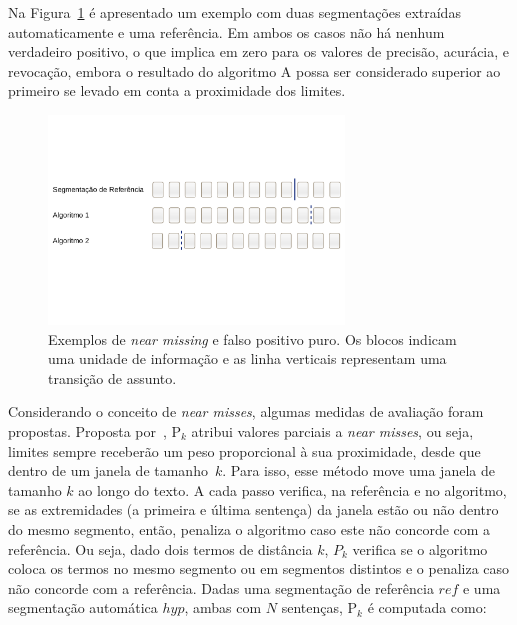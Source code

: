 Na Figura~\ref{fig:exemplosegmentacaozoom} é apresentado um exemplo com duas segmentações extraídas automaticamente e uma referência. Em ambos os casos não há nenhum verdadeiro positivo, o que implica em zero para os valores de precisão, acurácia, e revocação, embora o resultado do algoritmo A possa ser considerado superior ao primeiro se levado em conta a proximidade dos limites.

  \begin{figure}[!h]

	\centering
	\includegraphics[trim={ 0 180 0 180 },clip,page=1,width=0.7\textwidth]{conteudo/capitulos/figs/near-missing.pdf}
	\caption{Exemplos de \textit{near missing} e falso positivo puro. Os blocos indicam uma unidade de informação e as linha verticais representam uma transição de assunto. }
	\label{fig:exemplosegmentacaozoom}

  \end{figure}
  



Considerando o conceito de \textit{near misses}, algumas medidas de avaliação foram propostas. Proposta por~\cite{Beeferman1999}, P$_k$ atribui valores parciais a \textit{near misses}, ou seja, limites sempre receberão um peso proporcional à sua proximidade, desde que dentro de um janela de tamanho~$k$.  Para isso, esse método move uma janela de tamanho $k$ ao longo do texto. A cada passo verifica, na referência e no algoritmo, se as extremidades (a primeira e última sentença) da janela estão ou não dentro do mesmo segmento, então, penaliza o algoritmo caso este não concorde com a referência. Ou seja, dado dois termos de distância $k$, $P_k$ verifica se o algoritmo coloca os termos no mesmo segmento ou em segmentos distintos e o penaliza caso não concorde com a referência. Dadas uma segmentação de referência $ref$ e uma segmentação automática $hyp$, ambas com $N$ sentenças, P$_k$ é computada como:


